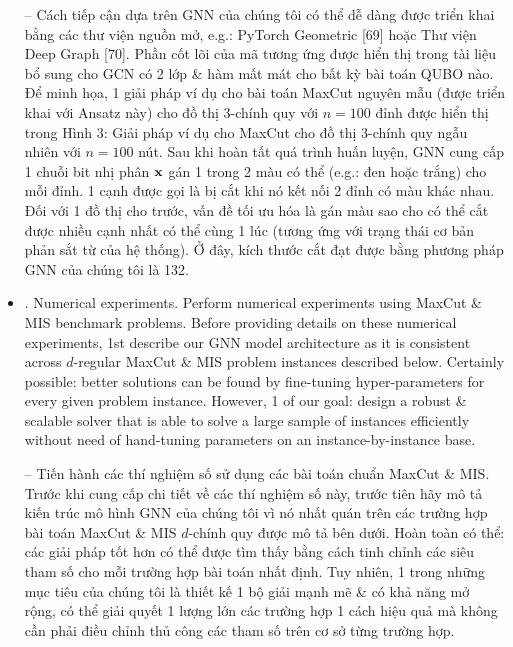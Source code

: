 \documentclass{article}
\begin{document}
\begin{itemize}
    -- Cách tiếp cận dựa trên GNN của chúng tôi có thể dễ dàng được triển khai bằng các thư viện nguồn mở, e.g.: PyTorch Geometric [69] hoặc Thư viện Deep Graph [70]. Phần cốt lõi của mã tương ứng được hiển thị trong tài liệu bổ sung cho GCN có 2 lớp \& hàm mất mát cho bất kỳ bài toán QUBO nào. Để minh họa, 1 giải pháp ví dụ cho bài toán MaxCut nguyên mẫu (được triển khai với Ansatz này) cho đồ thị 3-chính quy với $n = 100$ đỉnh được hiển thị trong {\sf Hình 3: Giải pháp ví dụ cho MaxCut cho đồ thị 3-chính quy ngẫu nhiên với $n = 100$ nút. Sau khi hoàn tất quá trình huấn luyện, GNN cung cấp 1 chuỗi bit nhị phân ${\bf x}$ gán 1 trong 2 màu có thể (e.g.: đen hoặc trắng) cho mỗi đỉnh. 1 cạnh được gọi là bị cắt khi nó kết nối 2 đỉnh có màu khác nhau. Đối với 1 đồ thị cho trước, vấn đề tối ưu hóa là gán màu sao cho có thể cắt được nhiều cạnh nhất có thể cùng 1 lúc (tương ứng với trạng thái cơ bản phản sắt từ của hệ thống).} Ở đây, kích thước cắt đạt được bằng phương pháp GNN của chúng tôi là 132.
    \item {. Numerical experiments.} Perform numerical experiments using MaxCut \& MIS benchmark problems. Before providing details on these numerical experiments, 1st describe our GNN model architecture as it is consistent across $d$-regular MaxCut \& MIS problem instances described below. Certainly possible: better solutions can be found by fine-tuning hyper-parameters for every given problem instance. However, 1 of our goal: design a robust \& scalable solver that is able to solve a large sample of instances efficiently without need of hand-tuning parameters on an instance-by-instance base.

    -- Tiến hành các thí nghiệm số sử dụng các bài toán chuẩn MaxCut \& MIS. Trước khi cung cấp chi tiết về các thí nghiệm số này, trước tiên hãy mô tả kiến trúc mô hình GNN của chúng tôi vì nó nhất quán trên các trường hợp bài toán MaxCut \& MIS $d$-chính quy được mô tả bên dưới. Hoàn toàn có thể: các giải pháp tốt hơn có thể được tìm thấy bằng cách tinh chỉnh các siêu tham số cho mỗi trường hợp bài toán nhất định. Tuy nhiên, 1 trong những mục tiêu của chúng tôi là thiết kế 1 bộ giải mạnh mẽ \& có khả năng mở rộng, có thể giải quyết 1 lượng lớn các trường hợp 1 cách hiệu quả mà không cần phải điều chỉnh thủ công các tham số trên cơ sở từng trường hợp.


\end{itemize}
\end{document}
